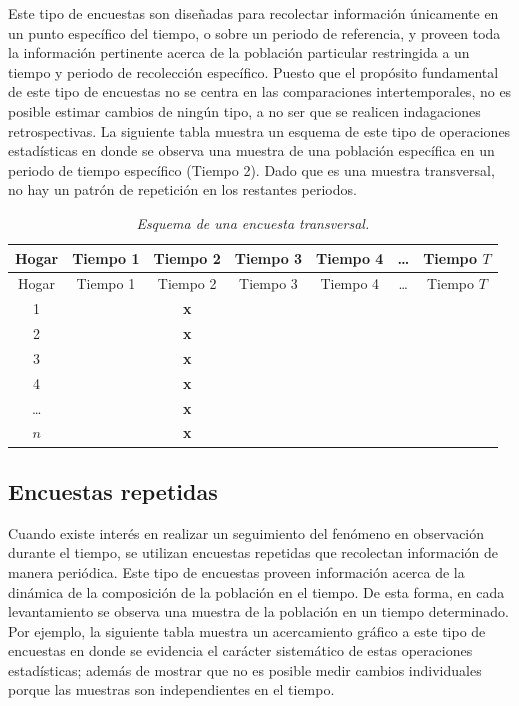 \documentclass[
  12pt,
  spanish,
]{book}
\begin{document}
Este tipo de encuestas son diseñadas para recolectar información únicamente en un punto específico del tiempo, o sobre un periodo de referencia, y proveen toda la información pertinente acerca de la población particular restringida a un tiempo y periodo de recolección específico. Puesto que el propósito fundamental de este tipo de encuestas no se centra en las comparaciones intertemporales, no es posible estimar cambios de ningún tipo, a no ser que se realicen indagaciones retrospectivas. La siguiente tabla muestra un esquema de este tipo de operaciones estadísticas en donde se observa una muestra de una población específica en un periodo de tiempo específico (Tiempo 2). Dado que es una muestra transversal, no hay un patrón de repetición en los restantes periodos.

\begin{longtable}[]{@{}ccccccc@{}}
\caption{\emph{Esquema de una encuesta transversal.}}\tabularnewline
\toprule
Hogar & Tiempo 1 & Tiempo 2 & Tiempo 3 & Tiempo 4 & \ldots{} & Tiempo \(T\) \\
\midrule
\endfirsthead
\toprule
Hogar & Tiempo 1 & Tiempo 2 & Tiempo 3 & Tiempo 4 & \ldots{} & Tiempo \(T\) \\
\midrule
\endhead
1 & & \textbf{x} & & & & \\
2 & & \textbf{x} & & & & \\
3 & & \textbf{x} & & & & \\
4 & & \textbf{x} & & & & \\
\ldots{} & & \textbf{x} & & & & \\
\(n\) & & \textbf{x} & & & & \\
\bottomrule
\end{longtable}

\hypertarget{encuestas-repetidas}{%
\subsection{Encuestas repetidas}\label{encuestas-repetidas}}

Cuando existe interés en realizar un seguimiento del fenómeno en observación durante el tiempo, se utilizan encuestas repetidas que recolectan información de manera periódica. Este tipo de encuestas proveen información acerca de la dinámica de la composición de la población en el tiempo. De esta forma, en cada levantamiento se observa una muestra de la población en un tiempo determinado. Por ejemplo, la siguiente tabla muestra un acercamiento gráfico a este tipo de encuestas en donde se evidencia el carácter sistemático de estas operaciones estadísticas; además de mostrar que no es posible medir cambios individuales porque las muestras son independientes en el tiempo.
\end{document}

